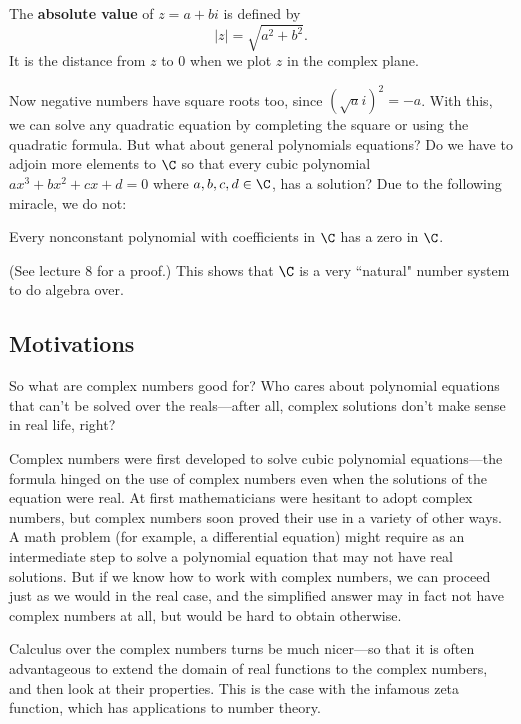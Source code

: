 The \textbf{absolute value} of $z=a+bi$ is defined by
\[
|z|=\sqrt{a^2+b^2}.
\]
It is the distance from $z$ to 0 when we plot $z$ in the complex plane.

Now negative numbers have square roots too, since $(\sqrt a i)^2=-a$. With this, we can solve any quadratic equation by completing the square or using the quadratic formula.
 But what about general polynomials equations? Do we have to adjoin more elements to $\C$ so that every cubic polynomial $ax^3+bx^2+cx+d=0$ where $a,b,c,d\in \C$, has a solution? Due to the following miracle, we do not:
\begin{thm}
Every nonconstant polynomial with coefficients in $\C$ has a zero in $\C$.
\end{thm}
(See lecture 8 for a proof.) This shows that $\C$ is a very ``natural" number system to do algebra over.

\subsection{Motivations}
So what are complex numbers good for? Who cares about polynomial equations that can't be solved over the reals---after all, complex solutions don't make sense in real life, right?

Complex numbers were first developed to solve cubic polynomial equations---the formula hinged on the use of complex numbers even when the solutions of the equation were real. At first mathematicians were hesitant to adopt complex numbers, but complex numbers soon proved their use in a variety of other ways. A math problem (for example, a differential equation) might require as an intermediate step to solve a polynomial equation that may not have real solutions. But if we know how to work with complex numbers, we can proceed just as we would in the real case, and the simplified answer may in fact not have complex numbers at all, but would be hard to obtain otherwise.

Calculus over the complex numbers turns be much nicer---so that it is often advantageous to extend the domain of real functions to the complex numbers, and then look at their properties. This is the case with the infamous zeta function, which has applications to number theory. 

